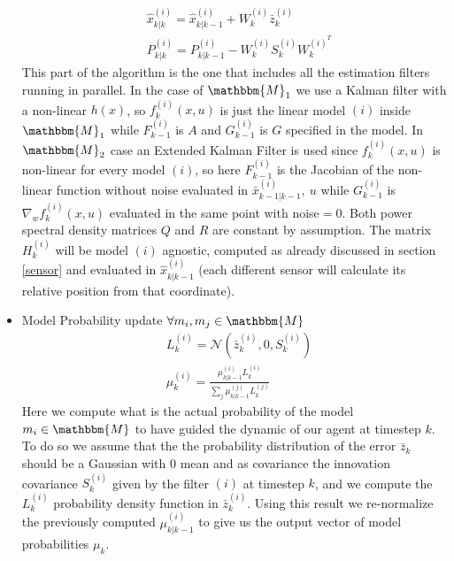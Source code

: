 \documentclass[twocolumn]{article}
\begin{document}
\begin{itemize}
\begin{align*}
               & \hat{x}^{(i)}_{k|k}=\hat{x}^{(i)}_{k|k-1}+W^{(i)}_{k}\bar{z}^{(i)}_{k}                                            \\
               & P^{(i)}_{k|k}=P^{(i)}_{k|k-1}-W^{(i)}_{k}S^{(i)}_{k}W^{(i)^{T}}_{k}
          \end{align*}
          This part of the algorithm is the one that includes all the estimation filters running in parallel. In the case 
          of $\mathbbm{M}_{1}$ we use a Kalman filter with a non-linear $h(x)$, so $f^{(i)}_{k}(x,u)$ is just the linear model 
          $(i)$ inside $\mathbbm{M}_{1}$ while $F^{(i)}_{k-1}$ is $A$ and $G^{(i)}_{k-1}$ is $G$ specified in the model. In 
          $\mathbbm{M}_{2}$ case an Extended Kalman Filter is used since $f^{(i)}_{k}(x,u)$ is non-linear for every model $(i)$, 
          so here $F^{(i)}_{k-1}$ is the Jacobian of the non-linear function without noise evaluated in $\bar{x}^{(i)}_{k-1|k-1},\ u$ while 
          $G^{(i)}_{k-1}$ is $\nabla_{w}f^{(i)}_{k}(x,u)$ evaluated in the same point with noise$=0$. Both power spectral density 
          matrices $Q$ and $R$ are constant by assumption. The matrix $H^{(i)}_{k}$ will be model $(i)$ agnostic, computed 
          as already discussed in section \ref{sensor} and evaluated in $\hat{x}^{(i)}_{k|k-1}$ (each different sensor will 
          calculate its relative position from that coordinate).
    \item Model Probability update $\forall m_{i},m_{j}\in \mathbbm{M}$
          \begin{align*}
               & L^{(i)}_{k}=\mathcal{N}(\bar{z}^{(i)}_{k},0,S^{(i)}_{k})                                \\
               & \mu^{(i)}_{k}=\frac{\mu^{(i)}_{k|k-1}L^{(i)}_{k}}{\sum_{j}\mu^{(j)}_{k|k-1}L^{(j)}_{k}}
          \end{align*}
          Here we compute what is the actual probability of the model $m_{i}\in\mathbbm{M}$ to have guided the dynamic of 
          our agent at timestep $k$. To do so we assume that the the probability distribution of the error $\bar{z}_{k}$ should be 
          a Gaussian with $0$ mean and as covariance the innovation covariance $S^{(i)}_{k}$ given by the filter $(i)$ at timestep
           $k$, and we compute the $L^{(i)}_{k}$ probability density function in $\bar{z}^{(i)}_{k}$. Using this result we re-normalize the previously 
           computed $\mu^{(i)}_{k|k-1}$ to give us the output vector of model probabilities $\mu_{k}$.
           \\

\end{itemize}
\end{document}
